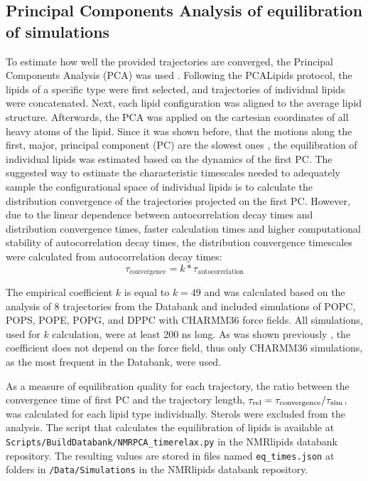 \documentclass[fleqn,10pt]{wlscirep}
\begin{document}
\subsection{Principal Components Analysis of equilibration of simulations}
To estimate how well the provided trajectories are converged, the Principal Components Analysis (PCA) was used \cite{buslaev16,buslaev2020principal}. Following the PCALipids \cite{buslaev2020principal} protocol, the lipids of a specific type were first selected, and trajectories of individual lipids were concatenated. Next, each lipid configuration was aligned to the average lipid structure. Afterwards, the PCA was applied on the cartesian coordinates of all heavy atoms of the lipid. Since it was shown before, that the motions along the first, major, principal component (PC) are the slowest ones \cite{buslaev16}, the equilibration of individual lipids was estimated based on the dynamics of the first PC. The suggested way to estimate the characteristic timescales needed to adequately sample the configurational space of individual lipids is to calculate the distribution convergence of the trajectories projected on the first PC\cite{buslaev16}. However, due to the linear dependence between autocorrelation decay times and distribution convergence times, faster calculation times and higher computational stability of autocorrelation decay times\cite{buslaev16, buslaev2020principal}, the distribution convergence timescales were calculated from autocorrelation decay times:
\begin{equation}
    \tau_{\text{convergence}} = k*\tau_{\text{autocorrelation}}
\end{equation}

The empirical coefficient $k$ is equal to $k = 49$ and was calculated based on the analysis of 8 trajectories from the Databank and included simulations of POPC, POPS, POPE, POPG, and DPPC with CHARMM36 force fields. All simulations, used for $k$ calculation, were at least 200 ns long. As was shown previously \cite{buslaev16}, the coefficient does not depend on the force field, thus only CHARMM36 simulations, as the most frequent in the Databank, were used. 

As a measure of equilibration quality for each trajectory, the ratio between the convergence time of first PC and the trajectory length, $\tau_{\rm rel} = \tau_{\text{convergence}}/\tau_{\text{sim}}$, was calculated for each lipid type individually. Sterols were excluded from the analysis. The script that calculates the equilibration of lipids is available at \texttt{Scripts/BuildDatabank/NMRPCA\_timerelax.py} in the NMRlipids databank repository. The resulting values are stored in files named \texttt{eq\_times.json} at folders in \texttt{/Data/Simulations} in the NMRlipids databank repository. 
\end{document}
